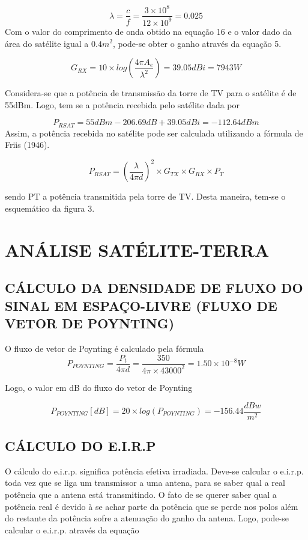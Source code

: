 \documentclass[a4paper,12pt]{article}
\begin{document}
\begin{equation}
 \lambda = \dfrac{c}{f} = \dfrac{3 \times 10^8}{12 \times 10^9} = 0.025
\end{equation}
Com o valor do comprimento de onda obtido na equação 16 e o valor dado da área
do satélite igual a $0.4m^2$, pode-se obter o ganho através da equação 5.

\begin{equation}
 G_{RX} = 10 \times log \left (\dfrac{4 \pi A_e}{\lambda^2} \right ) = 39.05dBi = 7943W
\end{equation}

Considera-se que a potência de transmissão da torre de TV para o satélite é de
55dBm. Logo, tem se a potência recebida pelo satélite dada por
 
 \begin{equation}
  P_{RSAT} = 55dBm - 206.69dB + 39.05dBi = - 112.64dBm
 \end{equation}
Assim, a potência recebida no satélite pode ser calculada utilizando a fórmula de
Friis (1946).

\begin{equation}
 P_{RSAT} = \left (\dfrac{\lambda}{4 \pi d} \right) ^2 \times G_{TX} \times G_{RX} \times P_T
\end{equation}

sendo PT a potência transmitida pela torre de TV.
Desta maneira, tem-se o esquemático da figura 3.

\section{ANÁLISE SATÉLITE-TERRA}
\subsection{CÁLCULO DA DENSIDADE DE FLUXO DO SINAL EM ESPAÇO-LIVRE (FLUXO DE VETOR DE POYNTING)}
O fluxo de vetor de Poynting é calculado pela fórmula
\begin{equation}
 P_{POYNTING} = \dfrac{P_t}{4 \pi d} = \dfrac{350}{4 \pi \times 43000^2} = 1.50 \times 10^{-8} W
 \end{equation}
 
 Logo, o valor em dB do fluxo do vetor de Poynting
 
\begin{equation}
 P_{POYNTING}[dB] = 20 \times log(P_{POYNTING}) = -156.44 \dfrac{dBw}{m^2} 
\end{equation}

\subsection{CÁLCULO DO E.I.R.P}
O cálculo do e.i.r.p. significa potência efetiva irradiada. Deve-se calcular o
e.i.r.p. toda vez que se liga um transmissor a uma antena, para se saber qual a real
potência que a antena está transmitindo. O fato de se querer saber qual a potência
real é devido à se achar parte da potência que se perde nos polos além do restante
da potência sofre a atenuação do ganho da antena.
Logo, pode-se calcular o e.i.r.p. através da equação
\end{document}
